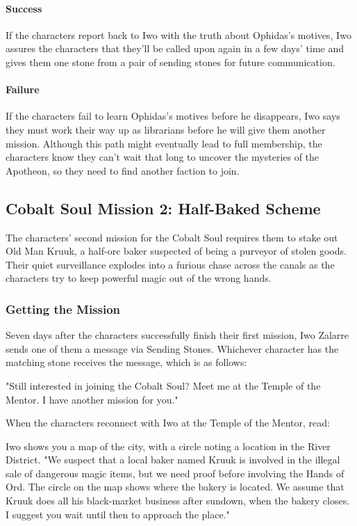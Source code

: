 \documentclass[10pt,a4,twoside,twocolumn,openany,nodeprecatedcode]{dndbook}
\begin{document}
\paragraph{Success}
If the characters report back to Iwo with the truth about Ophidas's motives, Iwo assures the characters that they'll be called upon again in a few days' time and gives them one stone from a pair of sending stones for future communication.
\paragraph{Failure}
If the characters fail to learn Ophidas's motives before he disappears, Iwo says they must work their way up as librarians before he will give them another mission. Although this path might eventually lead to full membership, the characters know they can't wait that long to uncover the mysteries of the Apotheon, so they need to find another faction to join.
\subsection{Cobalt Soul Mission 2: Half-Baked Scheme}
The characters' second mission for the Cobalt Soul requires them to stake out Old Man Kruuk, a half-orc baker suspected of being a purveyor of stolen goods. Their quiet surveillance explodes into a furious chase across the canals as the characters try to keep powerful magic out of the wrong hands.
\subsubsection{Getting the Mission}
Seven days after the characters successfully finish their first mission, Iwo Zalarre sends one of them a message via Sending Stones. Whichever character has the matching stone receives the message, which is as follows:
\begin{DndReadAloud}{}
"Still interested in joining the Cobalt Soul? Meet me at the Temple of the Mentor. I have another mission for you."
\end{DndReadAloud}

When the characters reconnect with Iwo at the Temple of the Mentor, read:
\begin{DndReadAloud}{}
Iwo shows you a map of the city, with a circle noting a location in the River District. "We suspect that a local baker named Kruuk is involved in the illegal sale of dangerous magic items, but we need proof before involving the Hands of Ord. The circle on the map shows where the bakery is located. We assume that Kruuk does all his black-market business after sundown, when the bakery closes. I suggest you wait until then to approach the place."
\end{DndReadAloud}
\end{document}
